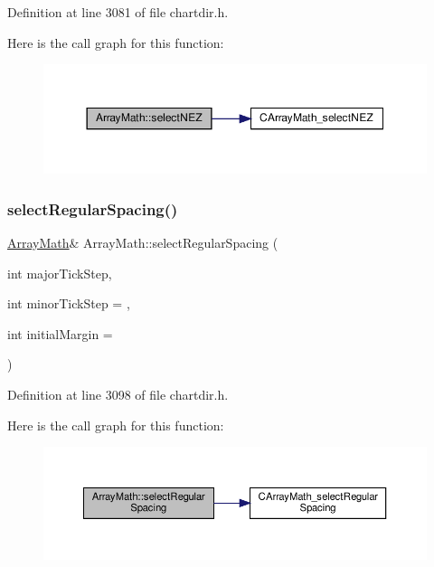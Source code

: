 Definition at line 3081 of file chartdir.\+h.

Here is the call graph for this function\+:
\nopagebreak
\begin{figure}[H]
\begin{center}
\leavevmode
\includegraphics[width=350pt]{class_array_math_a0ec9ff9be8d0f829ba79bd1a53a791a5_cgraph}
\end{center}
\end{figure}
\mbox{\label{class_array_math_a7fa60f8da0b8448ec591ce7f4b95f251}} 
\subsubsection{\texorpdfstring{select\+Regular\+Spacing()}{selectRegularSpacing()}}
{\footnotesize\ttfamily \hyperlink{class_array_math}{Array\+Math}\& Array\+Math\+::select\+Regular\+Spacing (\begin{DoxyParamCaption}\item[{int}]{major\+Tick\+Step,  }\item[{int}]{minor\+Tick\+Step = {},  }\item[{int}]{initial\+Margin = {} }\end{DoxyParamCaption})\hspace{0.3cm}{\ttfamily [inline]}}



Definition at line 3098 of file chartdir.\+h.

Here is the call graph for this function\+:
\nopagebreak
\begin{figure}[H]
\begin{center}
\leavevmode
\includegraphics[width=350pt]{class_array_math_a7fa60f8da0b8448ec591ce7f4b95f251_cgraph}
\end{center}
\end{figure}
\mbox{\label{class_array_math_a5e6c8318cbc69a3bb9da3c1c0ca86c26}} 
